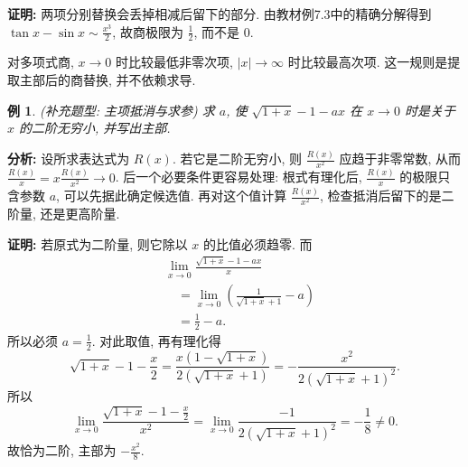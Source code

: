 \documentclass[UTF8,openany]{ctexbook}
\theoremstyle{chinesetextbook}
\newtheorem{example}{例}[section]
\newenvironment{cnproof}{\par\indent\textbf{证明:} \ignorespaces}{\par}
\begin{document}
\begin{cnproof}
两项分别替换会丢掉相减后留下的部分. 由教材例7.3中的精确分解得到 $\displaystyle \tan x-\sin x\sim\frac{x^3}{2}$, 故商极限为 $\displaystyle \frac12$, 而不是 $0$.
\end{cnproof}
对多项式商, $x\to0$ 时比较最低非零次项, $|x|\to\infty$ 时比较最高次项. 这一规则是提取主部后的商替换, 并不依赖求导.

\begin{example}
(补充题型: 主项抵消与求参) 求 $a$, 使 $\sqrt{1+x}-1-ax$ 在 $x\to0$ 时是关于 $x$ 的二阶无穷小, 并写出主部.
\end{example}
\par\indent\textbf{分析:} 设所求表达式为 $R(x)$. 若它是二阶无穷小, 则 $\displaystyle\frac{R(x)}{x^2}$ 应趋于非零常数, 从而 $\displaystyle\frac{R(x)}x=x\frac{R(x)}{x^2}\to0$. 后一个必要条件更容易处理: 根式有理化后, $\displaystyle\frac{R(x)}x$ 的极限只含参数 $a$, 可以先据此确定候选值. 再对这个值计算 $\displaystyle\frac{R(x)}{x^2}$, 检查抵消后留下的是二阶量, 还是更高阶量.
\begin{cnproof}
若原式为二阶量, 则它除以 $x$ 的比值必须趋零. 而
\[
\begin{aligned}
&\lim_{x\to0}\frac{\sqrt{1+x}-1-ax}{x}\\
&\quad=\lim_{x\to0}\left(\frac1{\sqrt{1+x}+1}-a\right)\\
&\quad=\frac12-a.
\end{aligned}
\]
所以必须 $\displaystyle a=\frac12$. 对此取值, 再有理化得
\[
\sqrt{1+x}-1-\frac x2
=\frac{x(1-\sqrt{1+x})}{2(\sqrt{1+x}+1)}
=-\frac{x^2}{2(\sqrt{1+x}+1)^2}.
\]
所以
\[
\lim_{x\to0}\frac{\sqrt{1+x}-1-\frac x2}{x^2}
=\lim_{x\to0}\frac{-1}{2(\sqrt{1+x}+1)^2}=-\frac18\ne0.
\]
故恰为二阶, 主部为 $\displaystyle-\frac{x^2}8$.
\end{cnproof}
\end{document}
